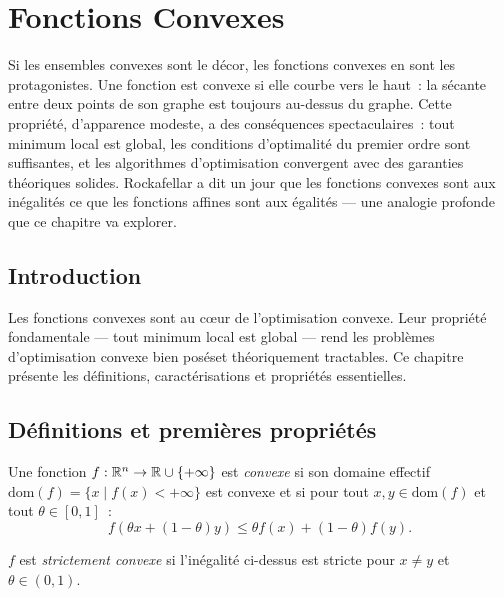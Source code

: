 \chapter{Fonctions Convexes}
\label{ch:fonctions}

Si les ensembles convexes sont le d\'ecor, les fonctions convexes en sont
les protagonistes. Une fonction est convexe si elle \og courbe vers le
haut\fg~: la s\'ecante entre deux points de son graphe est toujours
au-dessus du graphe. Cette propri\'et\'e, d'apparence modeste, a des
cons\'equences spectaculaires~: tout minimum local est global, les
conditions d'optimalit\'e du premier ordre sont suffisantes, et les
algorithmes d'optimisation convergent avec des garanties th\'eoriques
solides. Rockafellar a dit un jour que les fonctions convexes sont aux
in\'egalit\'es ce que les fonctions affines sont aux \'egalit\'es --- une
analogie profonde que ce chapitre va explorer.

\section{Introduction}

Les fonctions convexes sont au c\oe ur de l'optimisation convexe. Leur propri\'et\'e
fondamentale --- tout minimum local est global --- rend les probl\`emes d'optimisation
convexe \og{}bien pos\'es\fg et th\'eoriquement tractables. Ce chapitre pr\'esente
les d\'efinitions, caract\'erisations et propri\'et\'es essentielles.

\section{D\'efinitions et premi\`eres propri\'et\'es}

\begin{definition}
Une fonction $f : \mathbb{R}^n \to \mathbb{R} \cup \{+\infty\}$ est \emph{convexe} si son domaine
effectif $\mathrm{dom}(f) = \{x \mid f(x) < +\infty\}$ est convexe et si pour tout
$x, y \in \mathrm{dom}(f)$ et tout $\theta \in [0,1]$~:
\[
    f(\theta x + (1-\theta)y) \leq \theta f(x) + (1-\theta)f(y).
\]
\end{definition}

\begin{definition}
$f$ est \emph{strictement convexe} si l'in\'egalit\'e ci-dessus est stricte pour
$x \neq y$ et $\theta \in (0,1)$.
\end{definition}

